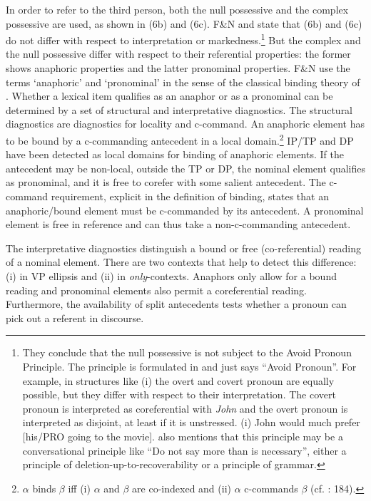 \documentclass[output=paper]{langsci/langscibook}
\begin{document}
In order to refer to the third person, both the null possessive and the complex possessive are used, as shown in (6b) and (6c). F\&N and \citet{Rodrigues2010} state that (6b) and (6c) do not differ with respect to interpretation or markedness.\footnote{They conclude that the null possessive is not subject to the Avoid Pronoun Principle. The principle is formulated in \citet{Chomsky1981} and just says “Avoid Pronoun”. For example, in structures like (i) the overt and covert pronoun are equally possible, but they differ with respect to their interpretation. The covert pronoun is interpreted as coreferential with \textit{John} and the overt pronoun is interpreted as disjoint, at least if it is unstressed. (i) John would much prefer [his/PRO going to the movie]. \citet[65]{Chomsky1981} also mentions that this principle may be a conversational principle like “Do not say more than is necessary”, either a principle of deletion-up-to-recoverability or a principle of grammar.} But the complex and the null possessive differ with respect to their referential properties: the former shows anaphoric properties and the latter pronominal properties. F\&N use the terms ‘anaphoric’ and ‘pronominal’ in the sense of the classical binding theory of \citet{Chomsky1981,Chomsky1986Knowledge}. Whether a lexical item qualifies as an anaphor or as a pronominal can be determined by a set of structural and interpretative diagnostics. The structural diagnostics are diagnostics for locality and c-command. An anaphoric element has to be bound by a c-commanding antecedent in a local domain.\footnote{$\alpha $ binds $\beta $ iff (i) $\alpha $ and $\beta $ are co-indexed and (ii) $\alpha $ c-commands $\beta $ (cf. \citealt{Chomsky1981}: 184).} IP/TP and DP have been detected as local domains for binding of anaphoric elements. If the antecedent may be non-local, outside the TP or DP, the nominal element qualifies as pronominal, and it is free to corefer with some salient antecedent. The c-command requirement, explicit in the definition of binding, states that an anaphoric/bound element must be c-commanded by its antecedent. A pronominal element is free in reference and can thus take a non-c-commanding antecedent.

The interpretative diagnostics distinguish a bound or free (co-referential) reading of a nominal element. There are two contexts that help to detect this difference: (i) in VP ellipsis and (ii) in \textit{only}{}-contexts. Anaphors only allow for a bound reading and pronominal elements also permit a coreferential reading. Furthermore, the availability of split antecedents tests whether a pronoun can pick out a referent in discourse.
\end{document}
